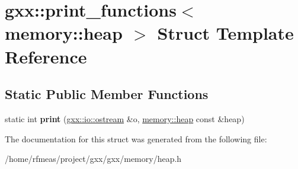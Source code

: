 \hypertarget{structgxx_1_1print__functions_3_01memory_1_1heap_01_4}{}\section{gxx\+:\+:print\+\_\+functions$<$ memory\+:\+:heap $>$ Struct Template Reference}
\label{structgxx_1_1print__functions_3_01memory_1_1heap_01_4}
\subsection*{Static Public Member Functions}
\begin{DoxyCompactItemize}
\item 
static int {\bfseries print} (\hyperlink{classgxx_1_1io_1_1ostream}{gxx\+::io\+::ostream} \&o, \hyperlink{classgxx_1_1memory_1_1heap}{memory\+::heap} const \&heap)\hypertarget{structgxx_1_1print__functions_3_01memory_1_1heap_01_4_a295662735bf01c77d22c421d5a576d9d}{}\label{structgxx_1_1print__functions_3_01memory_1_1heap_01_4_a295662735bf01c77d22c421d5a576d9d}

\end{DoxyCompactItemize}


The documentation for this struct was generated from the following file\+:\begin{DoxyCompactItemize}
\item 
/home/rfmeas/project/gxx/gxx/memory/heap.\+h\end{DoxyCompactItemize}
